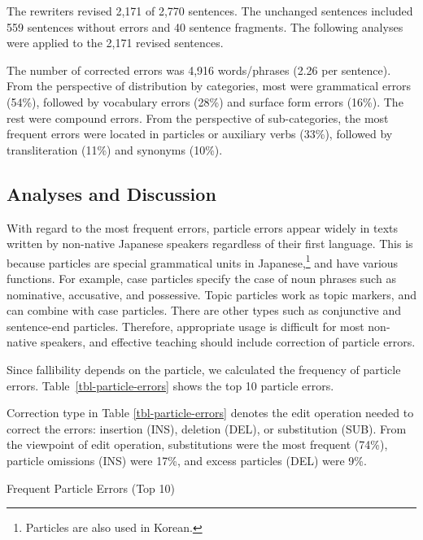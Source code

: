 \documentclass[english]{jnlp_1.4_rep}
\begin{document}
The rewriters revised 2,171 of 2,770 sentences. The unchanged
sentences included 559 sentences without errors and 40 sentence
fragments. The following analyses were applied to the 2,171 revised
sentences.


The number of corrected errors was 4,916 words/phrases (2.26 per
sentence). From the perspective of distribution by categories, most
were grammatical errors (54\%), followed by 
\linebreak
vocabulary errors (28\%)
and surface form errors (16\%). The rest were compound errors. From
the perspective of sub-categories, the most frequent errors were
located in particles or auxiliary verbs (33\%), followed by
transliteration (11\%) and synonyms (10\%).



\subsection{Analyses and Discussion}

With regard to the most frequent errors, particle errors appear widely
in texts written by non-native Japanese speakers regardless of their
first language. This is because particles are special grammatical
units in Japanese,\footnote{Particles are also used in Korean.} and
have various functions. For example, case particles specify the case
of noun phrases such as nominative, accusative, and possessive. Topic
particles work as topic markers, and can combine with case
particles. There are other types such as conjunctive and sentence-end
particles. Therefore, appropriate usage is difficult for most
non-native speakers, and effective teaching should include correction
of particle errors.


Since fallibility depends on the particle, we calculated the frequency
of particle errors. Table~\ref{tbl-particle-errors} shows the top 10
particle errors.

Correction type in Table \ref{tbl-particle-errors} denotes the edit
operation needed to correct the errors: insertion (INS), deletion
(DEL), or substitution (SUB). From the viewpoint of edit operation,
substitutions were the most frequent (74\%), particle omissions (INS)
were 17\%, and excess particles (DEL) were 9\%.



\begin{table}[t]
\caption{Frequent Particle Errors (Top 10)}
\label{tbl-particle-errors}

\vspace{1\Cvs}
\end{table}
\end{document}
